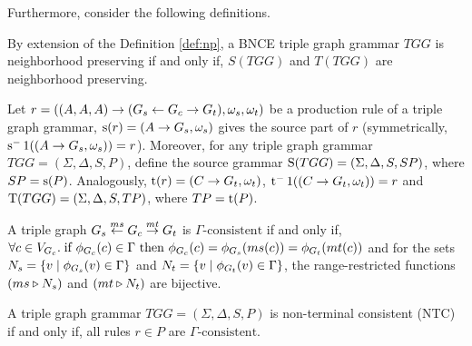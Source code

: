 \documentclass[runningheads]{llncs}
\begin{document}
Furthermore, consider the following definitions.

\begin{definition}
	By extension of the Definition \ref{def:np}, a BNCE triple graph grammar $TGG$ is neighborhood preserving if and only if, $S(TGG)$ and $T(TGG)$ are neighborhood preserving.
\end{definition}

\begin{definition}
	\label{def:source}
	Let $r = ((A,A,A) \pro (G_s \ms{} G_c \mt{} G_t), \omega_s, \omega_t)$ be a production rule of a triple graph grammar, $\source(r) = (A \pro G_s,\omega_s)$ gives the source part of $r$ (symmetrically, $\source^-1((A \pro G_s,\omega_s)) = r$). Moreover, for any triple graph grammar $TGG = (\Sigma, \Delta, S, P)$, define the source grammar $\Source(TGG) = (\Sigma, \Delta, S, SP)$, where $SP = \source(P)$. Analogously, $\target(r) = (C \pro G_t,\omega_t)$, $\target^-1((C \pro G_t,\omega_t)) = r$ and $\Target(TGG) = (\Sigma, \Delta, S, TP)$, where $TP = \target(P)$.
\end{definition}

\begin{definition}
	A triple graph $G_s \ms{ms} G_c \mt{mt} G_t$ is $\Gamma\text{-consistent}$ if and only if, 
	$\forall c \in V_{G_c} \. \text{if } \phi_{G_c}(c) \in \Gamma \text{ then } \phi_{G_c}(c) = \phi_{G_s}(ms(c)) = \phi_{G_t}(mt(c))$ and for the sets $N_s = \{v \st \phi_{G_s}(v) \in \Gamma\}$ and $N_t = \{v \st \phi_{G_t}(v) \in \Gamma\}$, the range-restricted functions $(ms \rrestr N_s)$ and $(mt \rrestr N_t)$ are bijective.
\end{definition}

\begin{definition}
	A triple graph grammar $TGG = (\Sigma, \Delta, S, P)$ is non-terminal consistent (NTC) if and only if, all rules $r \in P$ are $\Gamma\text{-consistent}$.
\end{definition}
\end{document}

